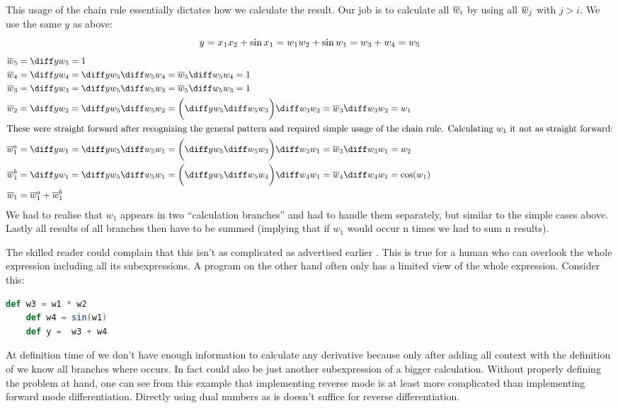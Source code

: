 This usage of the chain rule essentially dictates how we calculate the result. Our job is to calculate all $\overline{w}_i$ by using all $\overline{w}_j$ with $j > i$.  We use the same $y$ as above:
\[ y = x_1x_2 + \sin{x_1} = w_1w_2 + \sin{w_1} = w_3 + w_4 = w_5 \]
\begin{align*}
    \overw{5} &= \diffyw{5} = 1 \\
    \overw{4} &= \diffyw{4} = \diffyw{5}\diffw{5}{4} = \overw{5}\diffw{5}{4} = 1\\
    \overw{3} &= \diffyw{3} = \diffyw{5}\diffw{5}{3} = \overw{5}\diffw{5}{3} = 1\\
    \overw{2} &= \diffyw{2} = \diffyw{5}\diffw{5}{2} = \bigg(\diffyw{5}\diffw{5}{3}\bigg)\diffw{3}{2} = \overw{3}\diffw{3}{2} = w_1 \\
    \intertext{These were straight forward after recognizing the general pattern and required simple usage of the chain rule. Calculating $w_1$ it not as straight forward:}
    \overw{1}^a &= \diffyw{1} = \diffyw{5}\diffw{5}{1} = \bigg(\diffyw{5}\diffw{5}{3}\bigg)\diffw{3}{1} = \overw{3}\diffw{3}{1} = w_2 \\
    \overw{1}^b &= \diffyw{1} = \diffyw{5}\diffw{5}{1} = \bigg(\diffyw{5}\diffw{5}{4}\bigg)\diffw{4}{1} = \overw{4}\diffw{4}{1} = \cos(w_1) \\
    \overw{1} &= \overw{1}^a + \overw{1}^b
\end{align*}
We had to realise that $w_1$ appears in two ``calculation branches'' and had to handle them separately, but similar to the simple cases above. Lastly all results of all branches then have to be summed (implying that if $w_1$ would occur n times we had to sum n results).

The skilled reader could complain that this isn't as complicated as advertised \todowording earlier . This is true for a human who can overlook the whole expression including all its subexpressions. A program on the other hand often only has a limited view of the whole expression. Consider this:
\begin{lstlisting}[language=scala, label={lst:reverseProgramVsHuman}, caption={Limited context of a program opposed to a human}]
    def w3 = w1 * w2
    def w4 = sin(w1)
    def y =  w3 + w4
\end{lstlisting}
At definition time of  we don't have enough information to calculate any derivative because only after adding all context with the definition of  we know all branches where  occurs. In fact  could also be just another subexpression of a bigger calculation. Without properly defining the problem at hand, one can see from this example that implementing reverse mode is at least more complicated than implementing forward mode differentiation. \todowording Directly using dual numbers as is doesn't suffice for reverse differentiation.

